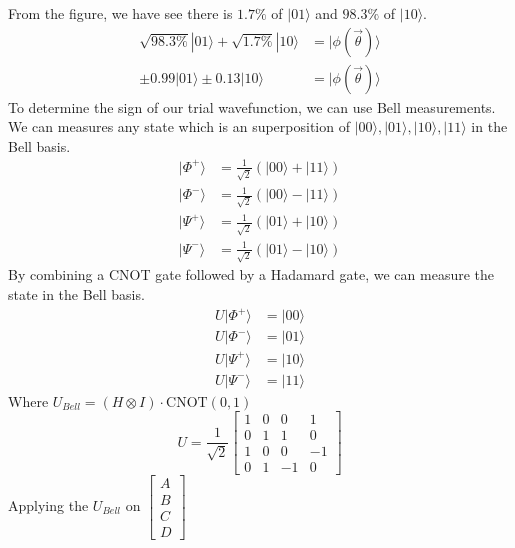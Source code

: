 \documentclass{article}
\begin{document}
\begin{itemize}
	      From the figure, we have see there is \(1.7 \% \) of \(|01\rangle\) and \(98.3 \%\) of \(|10\rangle\).
	      \begin{align*}
		      \sqrt{98.3 \%}|01\rangle +\sqrt{1.7 \% } |10\rangle & = |\phi(\vec{\theta}) \rangle \\
		      \pm 0.99 |01\rangle \pm 0.13 |10\rangle             & = |\phi(\vec{\theta}) \rangle
	      \end{align*}
	      To determine the sign of our trial wavefunction, we can use Bell measurements. We can measures any state which is an superposition of \(|00\rangle, |01\rangle, |10\rangle , |11\rangle\) in the Bell basis.
	      \begin{align*}
		      |\Phi^+\rangle & = \frac{1}{\sqrt{2}}(|00\rangle + |11\rangle) \\
		      |\Phi^-\rangle & = \frac{1}{\sqrt{2}}(|00\rangle - |11\rangle) \\
		      |\Psi^+\rangle & = \frac{1}{\sqrt{2}}(|01\rangle + |10\rangle) \\
		      |\Psi^-\rangle & = \frac{1}{\sqrt{2}}(|01\rangle - |10\rangle)
	      \end{align*}
	      By combining a CNOT gate followed by a Hadamard gate, we can measure the state in the Bell basis.
	      \begin{align*}
		      U |\Phi^+\rangle & = |00\rangle \\
		      U |\Phi^-\rangle & = |01\rangle \\
		      U |\Psi^+\rangle & = |10\rangle \\
		      U |\Psi^-\rangle & = |11\rangle
	      \end{align*}
	      Where \(U_{Bell} = \left( H \otimes I \right) \cdot \text{CNOT}(0,1)\)
	      \begin{equation*}
		      U = \frac{1}{\sqrt{2}}\begin{bmatrix}
			      1 & 0 & 0  & 1  \\
			      0 & 1 & 1  & 0  \\
			      1 & 0 & 0  & -1 \\
			      0 & 1 & -1 & 0
		      \end{bmatrix}
	      \end{equation*}
	      Applying the \(U_{Bell}\) on \(\begin{bmatrix}
		      A \\
		      B \\
		      C \\
		      D
	      \end{bmatrix}\)

\end{itemize}
\end{document}
